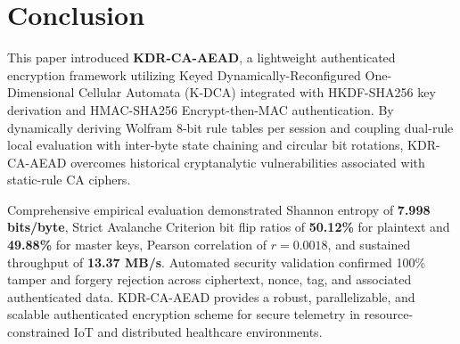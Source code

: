 \section{Conclusion}
\label{sec:conclusion}

This paper introduced \textbf{KDR-CA-AEAD}, a lightweight authenticated encryption framework utilizing Keyed Dynamically-Reconfigured One-Dimensional Cellular Automata (K-DCA) integrated with HKDF-SHA256 key derivation and HMAC-SHA256 Encrypt-then-MAC authentication. By dynamically deriving Wolfram 8-bit rule tables per session and coupling dual-rule local evaluation with inter-byte state chaining and circular bit rotations, KDR-CA-AEAD overcomes historical cryptanalytic vulnerabilities associated with static-rule CA ciphers.

Comprehensive empirical evaluation demonstrated Shannon entropy of \textbf{7.998 bits/byte}, Strict Avalanche Criterion bit flip ratios of \textbf{50.12\%} for plaintext and \textbf{49.88\%} for master keys, Pearson correlation of $r = \mathbf{0.0018}$, and sustained throughput of \textbf{13.37 MB/s}. Automated security validation confirmed 100\% tamper and forgery rejection across ciphertext, nonce, tag, and associated authenticated data. KDR-CA-AEAD provides a robust, parallelizable, and scalable authenticated encryption scheme for secure telemetry in resource-constrained IoT and distributed healthcare environments.
